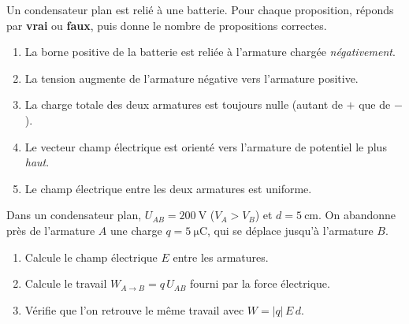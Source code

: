 \documentclass[11pt,a4paper]{article}
\begin{document}
\begin{exo}
Un condensateur plan est relié à une batterie. Pour chaque proposition, réponds par \textbf{vrai} ou
\textbf{faux}, puis donne le nombre de propositions correctes.
\begin{enumerate}[label=\alph*)]
  \item La borne positive de la batterie est reliée à l'armature chargée \emph{négativement}.
  \item La tension augmente de l'armature négative vers l'armature positive.
  \item La charge totale des deux armatures est toujours nulle (autant de $+$ que de $-$).
  \item Le vecteur champ électrique est orienté vers l'armature de potentiel le plus \emph{haut}.
  \item Le champ électrique entre les deux armatures est uniforme.
\end{enumerate}
\end{exo}

\begin{exo}
Dans un condensateur plan, $U_{AB} = \SI{200}{\volt}$ ($V_A > V_B$) et $d = \SI{5}{\centi\metre}$.
On abandonne près de l'armature $A$ une charge $q = \SI{+5}{\micro\coulomb}$, qui se déplace jusqu'à
l'armature $B$.
\begin{enumerate}[label=\alph*)]
  \item Calcule le champ électrique $E$ entre les armatures.
  \item Calcule le travail $W_{A\to B} = q\,U_{AB}$ fourni par la force électrique.
  \item Vérifie que l'on retrouve le même travail avec $W = |q|\,E\,d$.
\end{enumerate}
\end{exo}
\end{document}

